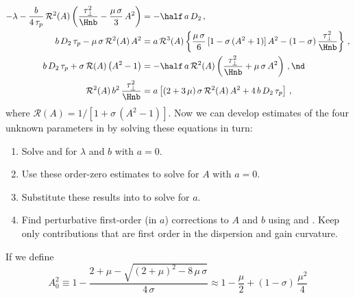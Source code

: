 \begin{subequations}
    \begin{align}
        \label{eqn:mflt_eqn_1} -\lambda  - \frac{b}{4\, \tau_p}\, \mathcal{R}^2(A) \left(\frac{\tau_\perp^2}{\Hnb} - \frac{\mu\, \sigma}{3}\, A^2\right) &= -\half\, a\, D_2\, ,\\
        \label{eqn:mflt_eqn_2} b\, D_2\, \tau_p - \mu\, \sigma\, \mathcal{R}^2(A)\, A^2 &= a\, \mathcal{R}^3(A) \left\{ \frac{\mu\, \sigma}{6}\, [1 - \sigma\, (A^2 + 1)]\, A^2 - (1 - \sigma)\, \frac{\tau_\perp^2}{\Hnb} \right\}\, ,\\
        \label{eqn:mflt_eqn_3} b\, D_2\, \tau_p + \sigma\, \mathcal{R}(A) \left( A^2 - 1 \right) &= -\half\, a\, \mathcal{R}^2(A) \left( \frac{\tau_\perp^2}{\Hnb} + \mu\, \sigma\, A^2 \right)\, , \nd \\
        \label{eqn:mflt_eqn_4} \mathcal{R}^2(A)\, b^2\, \frac{\tau_\perp^2}{\Hnb} &= a \left[ (2 + 3\, \mu)\, \sigma\, \mathcal{R}^2(A)\, A^2 + 4\, b\, D_2\, \tau_p \right]\, ,
    \end{align}
\end{subequations}
where $\mathcal{R}(A) = 1/[1 + \sigma\, (A^2 - 1)]$.
Now we can develop estimates of the four unknown parameters in  by solving these equations in turn:
\begin{enumerate}
    \item Solve  and   for $\lambda$ and $b$ with $a = 0$.
    \item Use these order-zero estimates to solve  for $A$ with $a = 0$.
    \item Substitute these results into  to solve for $a$.
    \item Find perturbative first-order (in $a$) corrections to $A$ and $b$ using  and . Keep only contributions that are first order in the dispersion and gain curvature.
\end{enumerate}
If we define
\begin{equation}
    A_0^2 \equiv 1 - \frac{2 + \mu - \sqrt{(2 + \mu)^2 - 8\, \mu\, \sigma}}{4\, \sigma} \approx 1 - \frac{\mu}{2} + (1 - \sigma)\, \frac{\mu^2}{4}
\end{equation}
